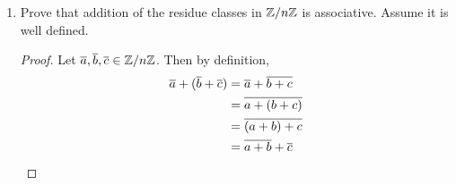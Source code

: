 \begin{enumerate}
			\begin{sln}
				\begin{enumerate}
					\item This is not a commutative binary operation.
						\begin{proof}
							Observe that $a\star b = a-b$ while $b\star a = b-a$.  This are clearly not equivalent if we suppose $a = 1$ and $b = 0$.  The first expression evaluates to $1$ while the second evaluates to $-1$.
						\end{proof}
					\item This is a commutative binary operation.
						\begin{proof}
							Observe that $a\star b = a+b+ab$ and $b\star a = b+a+ba$.  Since both multiplication and addition are commutative, these expressions are equivalent.
						\end{proof}
					\item This is a commutative binary operation.
						\begin{proof}
							Observe that \[a\star b = \dfrac{a+b}{5} = \dfrac{b+a}{5} = b \star a\]
						\end{proof}
					\item This is a commutative binary operation.
						\begin{proof}
							Observe that \[(a,b)\star (c,d) = (ad+bc, bd) = (cb+da, db) = (c,d)\star (a,b)\]
						\end{proof}
					\item This is not a commutative binary operation.
						\begin{proof}
							Observe that \[a\star b = \dfrac{a}{b}\]
							and \[b\star a = \dfrac{b}{a}\]
							For $a = 1, b=2$, $a\star b = \frac{1}{2}$ and $b\star a = 2$.
						\end{proof}
				\end{enumerate}
			\end{sln}
		\item Prove that addition of the residue classes in $\mathbb{Z}/n\mathbb{Z}$ is associative.  Assume it is well defined.
			\begin{proof}
				Let $\overline{a}, \overline{b}, \overline{c} \in \mathbb{Z}/n\mathbb{Z}$.  Then by definition,
				\begin{align*}
					\res{a} + (\res{b} + \res{c}) & = \res{a} + \res{b+c}\\
					&=\res{a+(b+c)}\\
					&=\res{(a+b)+c}\\
					&=\res{a+b} + \res{c}\\

\end{align*}
\end{proof}
\end{enumerate}
